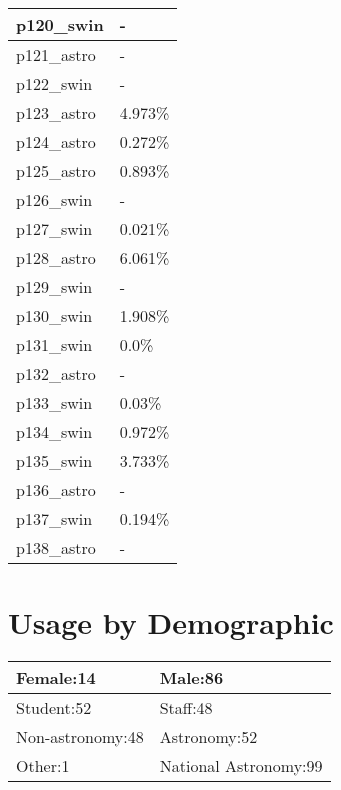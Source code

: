 \documentclass{article}%
\begin{document}
\begin{longtabu}{X[l] X[r]}
\hline%
p120\_swin&{-}\\%
\hline%
p121\_astro&{-}\\%
\hline%
p122\_swin&{-}\\%
\hline%
p123\_astro&4.973\%\\%
\hline%
p124\_astro&0.272\%\\%
\hline%
p125\_astro&0.893\%\\%
\hline%
p126\_swin&{-}\\%
\hline%
p127\_swin&0.021\%\\%
\hline%
p128\_astro&6.061\%\\%
\hline%
p129\_swin&{-}\\%
\hline%
p130\_swin&1.908\%\\%
\hline%
p131\_swin&0.0\%\\%
\hline%
p132\_astro&{-}\\%
\hline%
p133\_swin&0.03\%\\%
\hline%
p134\_swin&0.972\%\\%
\hline%
p135\_swin&3.733\%\\%
\hline%
p136\_astro&{-}\\%
\hline%
p137\_swin&0.194\%\\%
\hline%
p138\_astro&{-}\\%
\hline%
\end{longtabu}%
\section{Usage by Demographic}%

%
\begin{longtabu}{X[l] X[l]}%
Female:14&Male:86\\%
\hline%
Student:52&Staff:48\\%
\hline%
Non{-}astronomy:48&Astronomy:52\\%
\hline%
Other:1&National Astronomy:99\\%
\hline%
\end{longtabu}%
\end{document}
